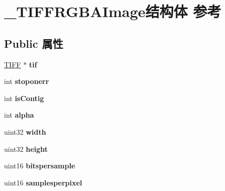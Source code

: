 \hypertarget{struct___t_i_f_f_r_g_b_a_image}{}\section{\+\_\+\+T\+I\+F\+F\+R\+G\+B\+A\+Image结构体 参考}
\label{struct___t_i_f_f_r_g_b_a_image}
\subsection*{Public 属性}
\begin{DoxyCompactItemize}
\item 
\mbox{\label{struct___t_i_f_f_r_g_b_a_image_a3bf136d391d612dd24ec8df47e165e0e}} 
\hyperlink{structtiff}{T\+I\+FF} $\ast$ {\bfseries tif}
\item 
\mbox{\label{struct___t_i_f_f_r_g_b_a_image_ad71ec4442a6dc22fb8dfe725f6691638}} 
int {\bfseries stoponerr}
\item 
\mbox{\label{struct___t_i_f_f_r_g_b_a_image_ad1ca29fb6a90d190c01191de1f2224ca}} 
int {\bfseries is\+Contig}
\item 
\mbox{\label{struct___t_i_f_f_r_g_b_a_image_a8e665d65a84fdcb4dba1cc671d4bf4d6}} 
int {\bfseries alpha}
\item 
\mbox{\label{struct___t_i_f_f_r_g_b_a_image_af501892fcd1bd9d93cb7e7a5741072b8}} 
uint32 {\bfseries width}
\item 
\mbox{\label{struct___t_i_f_f_r_g_b_a_image_a29e4ff458377c8d47411b631a9fce842}} 
uint32 {\bfseries height}
\item 
\mbox{\label{struct___t_i_f_f_r_g_b_a_image_a94e362df5fe110b858046844939ad0e2}} 
uint16 {\bfseries bitspersample}
\item 
\mbox{\label{struct___t_i_f_f_r_g_b_a_image_a1c35cf2de00b1a4cf47ca4a1d0e269bf}} 
uint16 {\bfseries samplesperpixel}
\item 
\mbox{\label{struct___t_i_f_f_r_g_b_a_image_a9c730169ff52de6910849860b939d261}} 

\end{DoxyCompactItemize}
